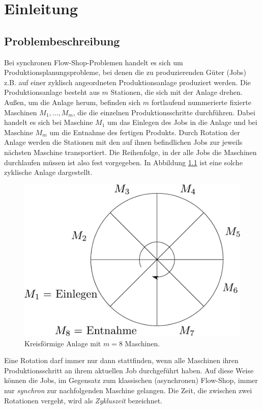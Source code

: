 \documentclass{scrreprt}
\begin{document}
\tableofcontents

\chapter{Einleitung}
\section{Problembeschreibung}
Bei synchronen Flow-Shop-Problemen handelt es sich um Produktions\-planungs\-probleme,
bei denen die zu produzierenden Güter (Jobs) z.B. auf einer zyklisch angeordneten Produktionsanlage
produziert werden. Die Produktionsanlage be\-steht aus $m$ Stationen, die sich mit der Anlage drehen.
Außen, um die Anlage herum, befinden sich $m$ fortlaufend nummerierte fixierte Maschinen $M_1,\ldots,M_m$, die die einzelnen Produktionsschritte durchführen.
Dabei handelt es sich bei Maschine $M_1$ um das Einlegen des Jobs in die Anlage und bei Maschine $M_m$ um die Entnahme des fertigen Produkts.
Durch Rotation der Anlage werden die Stationen mit den auf ihnen befindlichen Jobs zur jeweils nächsten Maschine transportiert.
Die Reihenfolge, in der alle Jobs die Maschinen durchlaufen müssen ist also fest vorgegeben.
In Abbildung \ref{abb:Anlage} ist eine solche zyklische Anlage dargestellt.
\begin{figure}
    \begin{center}
        \includegraphics[width=.8\textwidth]{graphics/anlage.pdf}
    \end{center}
    \caption{
        \label{abb:Anlage}
        Kreisförmige Anlage mit $m=8$ Maschinen.
    }
\end{figure}
Eine Rotation darf immer nur dann stattfinden, wenn alle Maschinen ihren Produktionsschritt an ihrem aktuellen Job
durchgeführt haben. Auf diese Weise können die Jobs, im Gegensatz zum klassischen (asynchronen) Flow-Shop, 
immer nur \textit{synchron} zur nachfolgenden Maschine gelangen.
Die Zeit, die zwischen zwei Rotationen vergeht, wird als \textit{Zykluszeit} bezeichnet.
\end{document}
